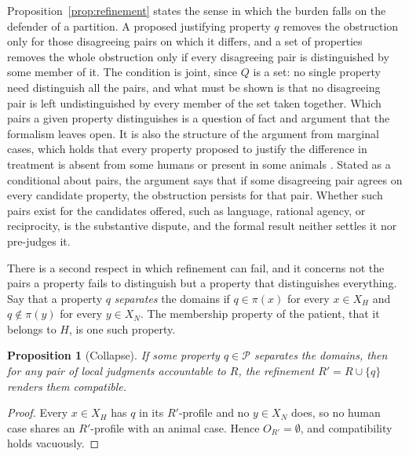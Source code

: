 \documentclass[11pt]{article}
\theoremstyle{definition}
\theoremstyle{plain}
\newtheorem{proposition}[definition]{Proposition}
\theoremstyle{definition}
\newcommand{\Rel}{R}
\newcommand{\Prop}{\mathcal{P}}
\begin{document}
Proposition~\ref{prop:refinement} states the sense in which the burden falls on the defender of a partition. A proposed justifying property $q$ removes the obstruction only for those disagreeing pairs on which it differs, and a set of properties removes the whole obstruction only if every disagreeing pair is distinguished by some member of it. The condition is joint, since $Q$ is a set: no single property need distinguish all the pairs, and what must be shown is that no disagreeing pair is left undistinguished by every member of the set taken together. Which pairs a given property distinguishes is a question of fact and argument that the formalism leaves open. It is also the structure of the argument from marginal cases, which holds that every property proposed to justify the difference in treatment is absent from some humans or present in some animals \cite{singer1975,regan1983}. Stated as a conditional about pairs, the argument says that if some disagreeing pair agrees on every candidate property, the obstruction persists for that pair. Whether such pairs exist for the candidates offered, such as language, rational agency, or reciprocity, is the substantive dispute, and the formal result neither settles it nor pre-judges it.

There is a second respect in which refinement can fail, and it concerns not the pairs a property fails to distinguish but a property that distinguishes everything. Say that a property $q$ \emph{separates} the domains if $q\in\pi(x)$ for every $x\in X_H$ and $q\notin\pi(y)$ for every $y\in X_N$. The membership property of the patient, that it belongs to $H$, is one such property.

\begin{proposition}[Collapse]\label{prop:collapse}
If some property $q\in\Prop$ separates the domains, then for any pair of local judgments accountable to $\Rel$, the refinement $\Rel'=\Rel\cup\{q\}$ renders them compatible.
\end{proposition}

\begin{proof}
Every $x\in X_H$ has $q$ in its $\Rel'$-profile and no $y\in X_N$ does, so no human case shares an $\Rel'$-profile with an animal case. Hence $O_{\Rel'}=\emptyset$, and compatibility holds vacuously.
\end{proof}
\end{document}
